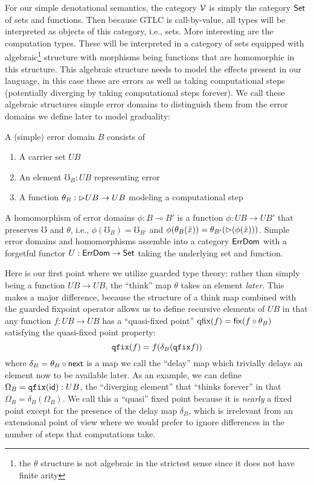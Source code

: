 For our simple denotational semantics, the category $\mathcal{V}$ is simply
the category $\mathsf{Set}$ of sets and functions. Then because GTLC is
call-by-value, all types will be interpreted as objects of this
category, i.e., sets. More interesting are the computation
types. These will be interpreted in a category of sets equipped with
algebraic\footnote{the $\theta$ structure is not algebraic in the
strictest sense since it does not have finite arity} structure with
morphisms being functions that are homomorphic in this structure.
This algebraic structure needs to model the effects present in our
language, in this case these are errors as well as taking
computational steps (potentially diverging by taking computational
steps forever).
%
We call these algebraic structures simple error domains to distinguish
them from the error domains we define later to model graduality:
\begin{definition}
  A (simple) error domain $B$ consists of
  \begin{enumerate}
  \item A carrier set $UB$
  \item An element $\mho_{B} : UB$ representing error
  \item A function $\theta_B : {{\vartriangleright}} UB \to UB$ modeling a computational step
  \end{enumerate}
  A homomorphism of error domains $\phi : B \multimap B'$ is a
  function $\phi : UB \to UB'$ that preserves $\mho$ and $\theta$, i.e.,
  $\phi(\mho_B) = \mho_{B'}$ and $\phi(\theta_{B}(\tilde{x})) =
  \theta_{B'}({\vartriangleright} (\phi(\tilde{x})))$.  Simple error domains and
  homomorphisms assemble into a category $\mathsf{ErrDom}$ with a forgetful
  functor $U : \mathsf{ErrDom} \to \mathsf{Set}$ taking the underlying set and
  function.
\end{definition}
Here is our first point where we utilize guarded type theory: rather
than simply being a function $UB \to UB$, the ``think'' map $\theta$
takes an element \emph{later}. This makes a major difference, because
the structure of a think map combined with the guarded fixpoint
operator allows us to define recursive elements of $UB$ in that any
function $f : UB \to UB$ has a ``quasi-fixed point'' $\textrm{qfix}(f)
= \mathsf{fix}(f \circ \theta_B)$ satisfying the quasi-fixed point property:
\[ \texttt{qfix}(f) = f(\delta_B(\texttt{qfix} f)) \]
where $\delta_B = \theta_B \circ \mathsf{next}$ is a map we call the ``delay''
map which trivially delays an element now to be available later.  As
an example, we can define $\Omega_B = \texttt{qfix}(\mathsf{id}) : UB$, the
``diverging element'' that ``thinks forever'' in that $\Omega_B =
\delta_B(\Omega_B)$. We call this a ``quasi'' fixed point because it is
\emph{nearly} a fixed point except for the presence of the delay map
$\delta_B$, which is irrelevant from an extensional point of view
where we would prefer to ignore differences in the number of steps
that computations take.

